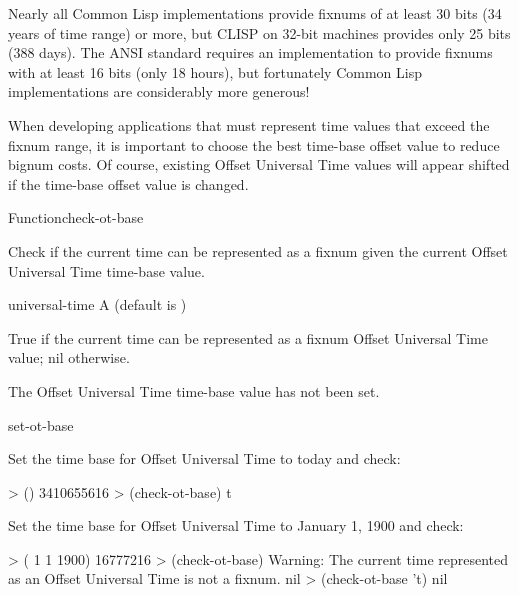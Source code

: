\documentclass[10pt,twoside,english,pdftex]{article}
\begin{document}
Nearly all Common Lisp implementations provide fixnums of at least 30
bits (34 years of time range) or more, but CLISP on 32-bit machines
provides only 25 bits (388 days).  The ANSI standard requires an
implementation to provide fixnums with at least 16 bits (only 18
hours), but fortunately Common Lisp implementations are considerably more
generous!

When developing applications that must represent time values that
exceed the fixnum range, it is important to choose the best time-base
offset value to reduce bignum costs.  Of course, existing Offset
Universal Time values will appear shifted if the time-base offset
value is changed.

\W\entities
\T\clearpage


\begin{functiondoc}{Function}{check-ot-base}{
    \returns{} }

%

\fnsyntax

\fnpurpose Check if the current time can be represented as a fixnum
given the current Offset Universal Time time-base value.

\fnpackage {}

\fnmodule {}

\fnargs
\begin{args}{universal-time}
 A  (default is \nil)
\end{args}

\fnreturns True if the current time can be represented as a fixnum
Offset Universal Time value; nil otherwise.

\fnerrors The Offset Universal Time time-base value has not been set.

\begin{alsos}{set-ot-base}
\also[ot2ut]
\also[ut2ot]
\end{alsos}

\fnexamples
Set the time base for Offset Universal Time to today and check:
\begin{example}
> ()
3410655616
> (check-ot-base)
t
\end{example}
Set the time base for Offset Universal Time to January 1, 1900 and check:
\begin{example}
> ( 1 1 1900)
16777216
> (check-ot-base)
Warning: The current time represented as an Offset Universal Time is not a fixnum.
nil
> (check-ot-base 't)
nil
\end{example}

\end{functiondoc}
\end{document}
